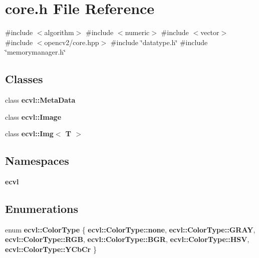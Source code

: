 \section{core.\+h File Reference}
\label{core_8h}
{\ttfamily \#include $<$algorithm$>$}\newline
{\ttfamily \#include $<$numeric$>$}\newline
{\ttfamily \#include $<$vector$>$}\newline
{\ttfamily \#include $<$opencv2/core.\+hpp$>$}\newline
{\ttfamily \#include \char`\"{}datatype.\+h\char`\"{}}\newline
{\ttfamily \#include \char`\"{}memorymanager.\+h\char`\"{}}\newline
\subsection*{Classes}
\begin{DoxyCompactItemize}
\item 
class \textbf{ ecvl\+::\+Meta\+Data}
\item 
class \textbf{ ecvl\+::\+Image}
\item 
class \textbf{ ecvl\+::\+Img$<$ T $>$}
\end{DoxyCompactItemize}
\subsection*{Namespaces}
\begin{DoxyCompactItemize}
\item 
 \textbf{ ecvl}
\end{DoxyCompactItemize}
\subsection*{Enumerations}
\begin{DoxyCompactItemize}
\item 
enum \textbf{ ecvl\+::\+Color\+Type} \{ \newline
\textbf{ ecvl\+::\+Color\+Type\+::none}, 
\textbf{ ecvl\+::\+Color\+Type\+::\+G\+R\+AY}, 
\textbf{ ecvl\+::\+Color\+Type\+::\+R\+GB}, 
\textbf{ ecvl\+::\+Color\+Type\+::\+B\+GR}, 
\newline
\textbf{ ecvl\+::\+Color\+Type\+::\+H\+SV}, 
\textbf{ ecvl\+::\+Color\+Type\+::\+Y\+Cb\+Cr}
 \}
\end{DoxyCompactItemize}
